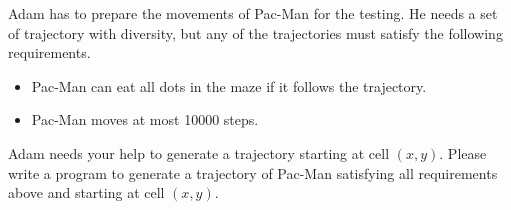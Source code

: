 Adam has to prepare the movements of Pac-Man for the testing. 
He needs a set of trajectory with diversity, 
but any of the trajectories must satisfy the following requirements.
\begin{itemize}
\tightlist
\item Pac-Man can eat all dots in the maze if it follows the trajectory.
\item Pac-Man moves at most 10000 steps.
\end{itemize}
Adam needs your help to generate a trajectory starting at cell $(x,y)$.
Please write a program to generate a trajectory of Pac-Man satisfying all 
requirements above and starting at cell $(x,y)$.

